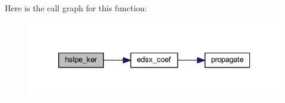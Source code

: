 Here is the call graph for this function\+:\nopagebreak
\begin{figure}[H]
\begin{center}
\leavevmode
\includegraphics[width=332pt]{Leroi__c_8f90_ae58b6750741316da9a6a86b44785fa58_cgraph}
\end{center}
\end{figure}
\mbox{\label{Leroi__c_8f90_a1965f18ad74a78ddcda474fa4268445f}} 

